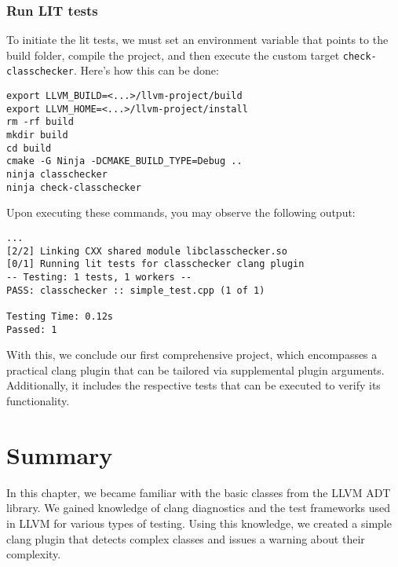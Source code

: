 \subsubsection{Run LIT tests}
To initiate the lit tests, we must set an environment variable that points to
the build folder, compile the project, and then execute the custom target
\texttt{check-classchecker}. Here's how this can be done: 
\begin{adjustwidth}{0em}{0em}
\begin{verbatim}
export LLVM_BUILD=<...>/llvm-project/build
export LLVM_HOME=<...>/llvm-project/install
rm -rf build
mkdir build
cd build
cmake -G Ninja -DCMAKE_BUILD_TYPE=Debug ..
ninja classchecker
ninja check-classchecker
\end{verbatim}
\end{adjustwidth}
Upon executing these commands, you may observe the following output:

\begin{adjustwidth}{0em}{0em}
\begin{verbatim}
...
[2/2] Linking CXX shared module libclasschecker.so
[0/1] Running lit tests for classchecker clang plugin
-- Testing: 1 tests, 1 workers --
PASS: classchecker :: simple_test.cpp (1 of 1)

Testing Time: 0.12s
Passed: 1
\end{verbatim}
\end{adjustwidth}
With this, we conclude our first comprehensive project, which encompasses a
practical clang plugin that can be tailored via supplemental plugin
arguments. Additionally, it includes the respective tests that can be executed
to verify its functionality. 

\section{Summary}
In this chapter, we became familiar with the basic classes from the LLVM ADT
library. We gained knowledge of clang diagnostics and the test frameworks used
in LLVM for various types of testing. Using this knowledge, we created a simple
clang plugin that detects complex classes and issues a warning about their
complexity. 

